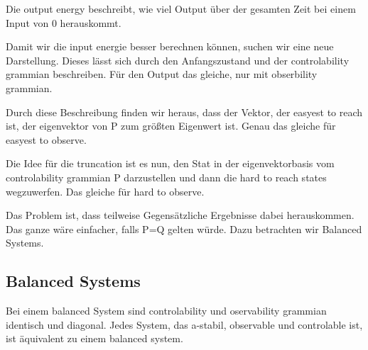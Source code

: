 \documentclass[]{article}
\begin{document}
Die output energy beschreibt, wie viel Output über der gesamten Zeit bei einem Input von 0 herauskommt.  
 
Damit wir die input energie besser berechnen können, suchen wir eine neue Darstellung. Dieses lässt sich durch den Anfangszustand und der controlability grammian beschreiben. Für den Output das gleiche, nur mit obserbility grammian. 

Durch diese Beschreibung finden wir heraus, dass der Vektor, der easyest to reach ist, der eigenvektor von P zum größten Eigenwert ist. Genau das gleiche für easyest to observe. 

Die Idee für die truncation ist es nun, den Stat in der eigenvektorbasis vom controlability grammian P darzustellen und dann die hard to reach states wegzuwerfen. Das gleiche für hard to observe. 

Das Problem ist, dass teilweise Gegensätzliche Ergebnisse dabei herauskommen. Das ganze wäre einfacher, falls P=Q gelten würde. Dazu betrachten wir Balanced Systems.

\subsection{Balanced Systems}
Bei einem balanced System sind controlability und oservability grammian identisch und diagonal. Jedes System, das a-stabil, observable und controlable ist, ist äquivalent zu einem balanced system. 
 
\end{document}
